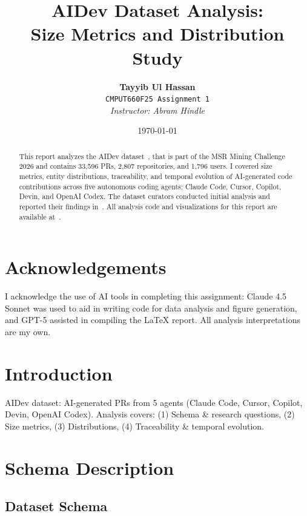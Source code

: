 \documentclass[11pt]{article}
\title{\textbf{AIDev Dataset Analysis:\\Size Metrics and Distribution Study}}
\author{
    \textbf{Tayyib Ul Hassan}\\
    \texttt{CMPUT660F25 Assignment 1}\\[0.5em]
    \textit{Instructor: Abram Hindle}
}
\date{\today}
\begin{document}
\maketitle

\begin{abstract}
This report analyzes the AIDev dataset~\cite{li2025aidev}, that is part of the MSR Mining Challenge 2026 and contains 33,596 PRs, 2,807 repositories, and 1,796 users. I covered size metrics, entity distributions, traceability, and temporal evolution of AI-generated code contributions across five autonomous coding agents: Claude Code, Cursor, Copilot, Devin, and OpenAI Codex. The dataset curators conducted initial analysis and reported their findings in~\cite{li2025riseaiteammates}. All analysis code and visualizations for this report are available at~\cite{githubRepo}.
\end{abstract}

\tableofcontents
\newpage

\section*{Acknowledgements}

I acknowledge the use of AI tools in completing this assignment: Claude 4.5 Sonnet was used to aid in writing code for data analysis and figure generation, and GPT-5 assisted in compiling the LaTeX report. All analysis interpretations are my own.

\newpage

\section{Introduction}

AIDev dataset: AI-generated PRs from 5 agents (Claude Code, Cursor, Copilot, Devin, OpenAI Codex). Analysis covers: (1) Schema \& research questions, (2) Size metrics, (3) Distributions, (4) Traceability \& temporal evolution.

\section{Schema Description}

\subsection{Dataset Schema}
\end{document}
